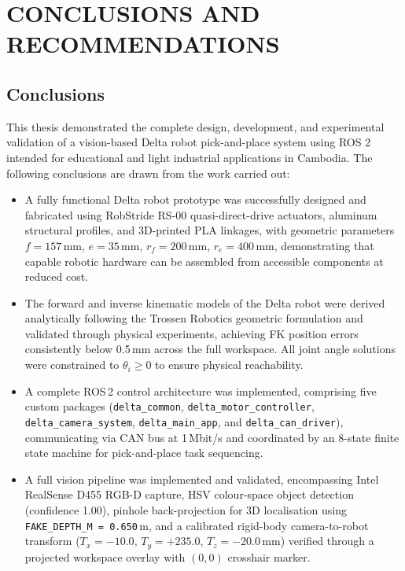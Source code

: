 \section{CONCLUSIONS AND RECOMMENDATIONS}

\subsection{Conclusions}
\hspace{1.27cm}
This thesis demonstrated the complete design, development, and experimental validation of a vision-based Delta robot pick-and-place system using ROS 2 intended for educational and light industrial applications in Cambodia. The following conclusions are drawn from the work carried out:

\begin{itemize}
    \item A fully functional Delta robot prototype was successfully designed and fabricated using RobStride RS-00 quasi-direct-drive actuators, aluminum structural profiles, and 3D-printed PLA linkages, with geometric parameters $f=157$\,mm, $e=35$\,mm, $r_f=200$\,mm, $r_e=400$\,mm, demonstrating that capable robotic hardware can be assembled from accessible components at reduced cost.

    \item The forward and inverse kinematic models of the Delta robot were derived analytically following the Trossen Robotics geometric formulation and validated through physical experiments, achieving FK position errors consistently below 0.5\,mm across the full workspace. All joint angle solutions were constrained to $\theta_i \geq 0$ to ensure physical reachability.

    \item A complete ROS\,2 control architecture was implemented, comprising five custom packages (\texttt{delta\_common}, \texttt{delta\_motor\_controller}, \texttt{delta\_camera\_system}, \texttt{delta\_main\_app}, and \texttt{delta\_can\_driver}), communicating via CAN bus at 1\,Mbit/s and coordinated by an 8-state finite state machine for pick-and-place task sequencing.

    \item A full vision pipeline was implemented and validated, encompassing Intel RealSense D455 RGB-D capture, HSV colour-space object detection (confidence 1.00), pinhole back-projection for 3D localisation using \texttt{FAKE\_DEPTH\_M = 0.650}\,m, and a calibrated rigid-body camera-to-robot transform ($T_x=-10.0$, $T_y=+235.0$, $T_z=-20.0$\,mm) verified through a projected workspace overlay with $(0,0)$ crosshair marker.


\end{itemize}
